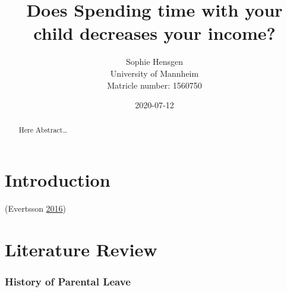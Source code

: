 \documentclass[
  12pt,
]{article}
\title{\vspace{1cm}Does Spending time with your child decreases your income?\vspace{0.5cm}\\}
\author{Sophie Hensgen\\
University of Mannheim\\
Matricle number: 1560750}
\date{2020-07-12\\}
\begin{document}
\maketitle
\begin{abstract}
\noindent{}Here Abstract\ldots{}\vspace{.8cm}
\end{abstract}

\hypertarget{introduction}{%
\section{Introduction}\label{introduction}}

(Evertsson \protect\hyperlink{ref-evertsson_parental_2016}{2016})

\hypertarget{literature-review}{%
\section{Literature Review}\label{literature-review}}

\hypertarget{history-of-parental-leave}{%
\subsubsection*{History of Parental Leave}\label{history-of-parental-leave}}
\end{document}
